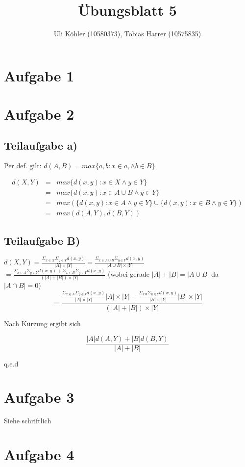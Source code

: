 \documentclass[a4paper,10pt,oneside,leqno]{scrartcl}
\title{Übungsblatt 5}
\author{Uli Köhler (10580373), Tobias Harrer (10575835)}
\begin{document}
\maketitle

\section*{Aufgabe 1}%

\section*{Aufgabe 2}%
\subsection*{Teilaufgabe a)}
Per def. gilt: $d(A,B) = max\{a, b:x\in a, \wedge b \in B\}$

\begin{align}
 d(X,Y) &=& max\{d(x,y):x\in X \wedge y \in Y\}\\
 &=& max\{d(x,y):x\in A\cup B \wedge y \in Y\}\\
 &=& max(\{d(x,y):x\in A \wedge y \in Y\} \cup \{d(x,y):x\in B \wedge y \in Y\})\\
 &=& max(d(A,Y), d(B,Y))
\end{align}

\subsection*{Teilaufgabe B)}
$d(X,Y) = \frac{\Sigma_{x \in X}\Sigma_{y \in Y}d(x,y)}{|X|\times |Y|}
=\frac{\Sigma_{x \in A\cup B}\Sigma_{y \in Y}d(x,y)}{|A\cup B|\times |Y|}$\\
$=\frac{\Sigma_{x \in A}\Sigma_{y \in Y}d(x,y) + \Sigma_{x \in B}\Sigma_{y \in Y}d(x,y)}{(|A| + |B|)\times |Y|}$
(wobei gerade $|A| + |B| = |A \cup B|$ da $|A \cap B| = 0$)\\

\[
 =\frac{\frac{\Sigma_{x \in A}\Sigma_{y \in Y}d(x,y)}{|A|\times |Y|} |A|\times|Y| + \frac{\Sigma_{x B}\Sigma_{y \in Y}d(x,y)}{|B|\times |Y|} |B|\times|Y|}{(|A|+|B|)\times |Y|}
\]

Nach Kürzung ergibt sich

\[
 \frac{|A|d(A,Y) + |B|d(B,Y)}{|A| + |B|}
\]

q.e.d


\section*{Aufgabe 3}%
Siehe schriftlich

\section*{Aufgabe 4}%


\end{document}
